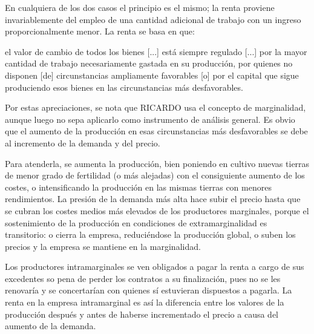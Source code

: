 \documentclass[10pt,a4paper]{article}
\begin{document}
En cualquiera de los dos casos el principio es el mismo; la renta proviene invariablemente del empleo de una cantidad adicional de trabajo con un ingreso proporcionalmente menor. La renta se basa en que: 

el valor de cambio de todos los bienes [...] está siempre regulado [...] por la mayor cantidad de trabajo necesariamente gastada en su producción, por quienes no disponen [de] circunstancias ampliamente favorables [o] por el capital que sigue produciendo esos bienes en las circunstancias más desfavorables.

Por estas apreciaciones, se nota que RICARDO usa el concepto de marginalidad, aunque luego no sepa aplicarlo como instrumento de análisis general. Es obvio que el aumento de la producción en esas circunstancias más desfavorables se debe al incremento de la demanda y del precio.

Para atenderla, se aumenta la producción, bien poniendo en cultivo nuevas tierras de menor grado de fertilidad (o más alejadas) con el consiguiente aumento de los costes, o intensificando la producción en las mismas tierras con menores rendimientos. La presión de la demanda más alta hace subir el precio hasta que se cubran los costes medios más elevados de los productores marginales, porque el sostenimiento de la producción en condiciones de extramarginalidad es transitorio: o cierra la empresa, reduciéndose la producción global, o suben los precios y la empresa se mantiene en la marginalidad. 

Los productores intramarginales se ven obligados a pagar la renta a cargo de sus excedentes so pena de perder los contratos a su finalización, pues no se les renovaría y se concertarían con quienes sí estuvieran dispuestos a pagarla. La renta en la empresa intramarginal es así la diferencia entre los valores de la producción después y antes de haberse incrementado el precio a causa del aumento de la demanda. 
\end{document}
